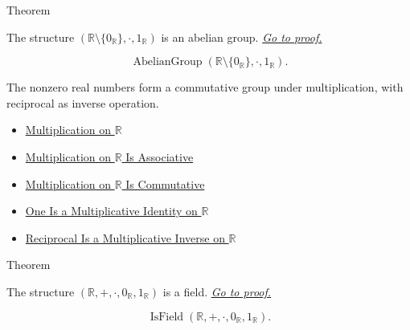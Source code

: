 \begin{theorembox}{Theorem}
\begin{theorem}
\label{thm:r-nonzero-multiplicative-abelian-group}
The structure $(\mathbb{R}\setminus\{0_{\mathbb{R}}\},\cdot,1_{\mathbb{R}})$
is an abelian group.
\hyperref[prf:r-nonzero-multiplicative-abelian-group]{\textit{Go to proof.}}
\end{theorem}
\end{theorembox}

\begin{remark*}
\[
\operatorname{AbelianGroup}(\mathbb{R}\setminus\{0_{\mathbb{R}}\},\cdot,1_{\mathbb{R}}).
\]
\end{remark*}

\begin{remark*}[Interpretation]
The nonzero real numbers form a commutative group under multiplication, with reciprocal as inverse operation.
\end{remark*}

\begin{dependencies}
\begin{itemize}
\item \hyperref[def:multiplication-on-r]{Multiplication on $\mathbb{R}$}
  \item \hyperref[thm:multiplication-on-r-associative]{Multiplication on $\mathbb{R}$ Is Associative}
  \item \hyperref[thm:multiplication-on-r-commutative]{Multiplication on $\mathbb{R}$ Is Commutative}
  \item \hyperref[thm:one-multiplicative-identity-on-r]{One Is a Multiplicative Identity on $\mathbb{R}$}
  \item \hyperref[thm:reciprocal-multiplicative-inverse-on-r]{Reciprocal Is a Multiplicative Inverse on $\mathbb{R}$}
\end{itemize}
\end{dependencies}

\begin{theorembox}{Theorem}
\begin{theorem}
\label{thm:r-is-a-field}
The structure $(\mathbb{R},+,\cdot,0_{\mathbb{R}},1_{\mathbb{R}})$ is a field.
\hyperref[prf:r-is-a-field]{\textit{Go to proof.}}
\end{theorem}
\end{theorembox}

\begin{remark*}
\[
\operatorname{IsField}(\mathbb{R},+,\cdot,0_{\mathbb{R}},1_{\mathbb{R}}).
\]
\end{remark*}

